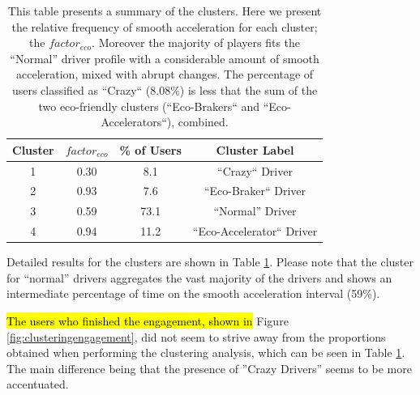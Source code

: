 \documentclass[preprint,authoryear,12pt]{elsarticle}
\begin{document}
\begin{table}[!htb]
	\renewcommand*{\arraystretch}{1.4}
	\caption{This table presents a summary of the clusters. Here we present the relative frequency of smooth acceleration for each cluster; the $factor_{eco}$. Moreover the majority of players fits the ``Normal'' driver profile with a considerable amount of smooth acceleration, mixed with abrupt changes. The percentage of users classified as ``Crazy`` (8.08\%) is less that the sum of the two eco-friendly clusters (``Eco-Brakers`` and ``Eco-Accelerators``), combined. }
	\begin{center}
		\begin{tabular}{c|c|c|c}
			Cluster & $factor_{eco}$ & \% of Users & Cluster Label \\
			\hline
			1 &	 0.30
			& 8.1  & ``Crazy`` Driver  \\
			
			2 & 0.93
			& 7.6  &  ``Eco-Braker`` Driver \\
			
			3 &	 0.59
			& 73.1  &  ``Normal'' Driver  \\
			
			4 & 0.94
			& 11.2  &  ``Eco-Accelerator`` Driver \\
		\end{tabular}
	\end{center}
	\label{T:factors}
\end{table}

Detailed results for the clusters are shown in Table \ref{T:factors}.
Please note that the cluster for ``normal'' drivers aggregates the vast majority of the drivers and shows an intermediate percentage of time on the smooth acceleration interval (59\%).

\hl{The users who finished the engagement, shown in 
}Figure \ref{fig:clusteringengagement}, did not seem to strive away from the proportions obtained when performing the clustering analysis, which can be seen in Table \ref{T:factors}. The main difference being that the presence of ''Crazy Drivers'' seems to be more accentuated.
\end{document}

